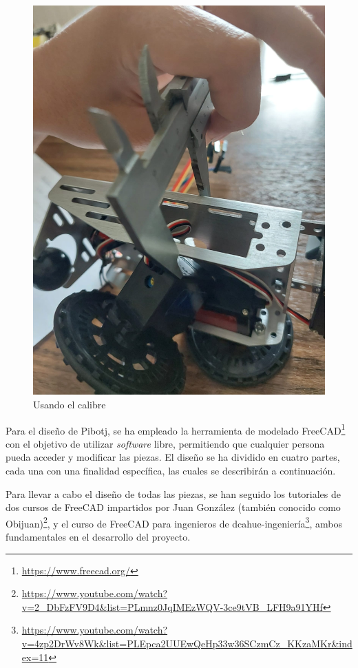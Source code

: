 \begin{figure}[ht!]
\begin{minipage}{0.4\linewidth}
		\includegraphics[width=\linewidth]{figs/cap5/calib2.jpeg}
		\caption*{\centering}
	\end{minipage}
	\caption{Usando el calibre}
	\label{fig:calibre}
\end{figure}

\setcounter{footnote}{65}

Para el diseño de Pibotj, se ha empleado la herramienta de modelado FreeCAD\footnote{\url{https://www.freecad.org/}} con el objetivo de utilizar \textit{software} libre, permitiendo que cualquier persona pueda acceder y modificar las piezas. El diseño se ha dividido en cuatro partes, cada una con una finalidad específica, las cuales se describirán a continuación.

Para llevar a cabo el diseño de todas las piezas, se han seguido los tutoriales de dos cursos de FreeCAD impartidos por Juan González (también conocido como Obijuan)\footnote{\url{https://www.youtube.com/watch?v=2_DbFzFV9D4&list=PLmnz0JqIMEzWQV-3ce9tVB_LFH9a91YHf}}, y el curso de FreeCAD para ingenieros de dcahue-ingeniería\footnote{\url{https://www.youtube.com/watch?v=4zp2DrWv8Wk&list=PLEpca2UUEwQeHp33w36SCzmCz_KKzaMKr&index=11}}, ambos fundamentales en el desarrollo del proyecto.

